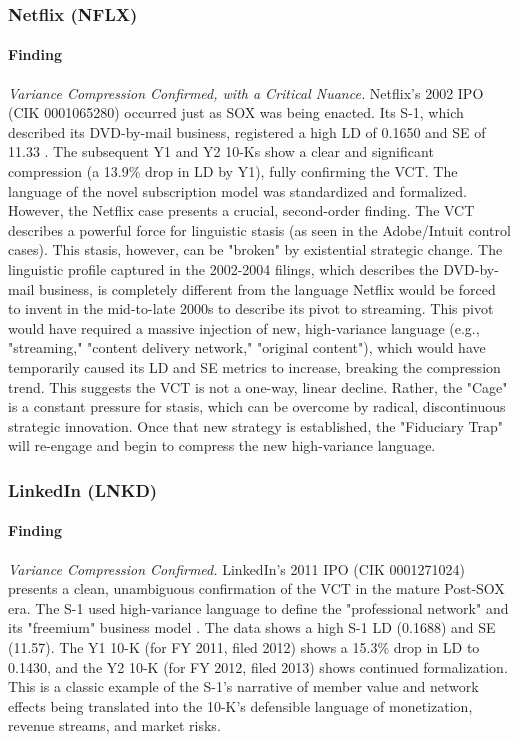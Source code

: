 \documentclass[12pt, letterpaper]{article}
\begin{document}
\subsubsection{Netflix (NFLX)}
\paragraph{Finding} \textit{Variance Compression Confirmed, with a Critical Nuance.}
Netflix's 2002 IPO (CIK 0001065280) occurred just as SOX was being enacted. Its S-1, which described its DVD-by-mail business, registered a high LD of 0.1650 and SE of 11.33 \cite{key10, key31}. The subsequent Y1 and Y2 10-Ks show a clear and significant compression (a 13.9\% drop in LD by Y1), fully confirming the VCT. The language of the novel subscription model was standardized and formalized. However, the Netflix case presents a crucial, second-order finding. The VCT describes a powerful force for linguistic stasis (as seen in the Adobe/Intuit control cases). This stasis, however, can be "broken" by existential strategic change. The linguistic profile captured in the 2002-2004 filings, which describes the DVD-by-mail business, is completely different from the language Netflix would be forced to invent in the mid-to-late 2000s to describe its pivot to streaming. This pivot would have required a massive injection of new, high-variance language (e.g., "streaming," "content delivery network," "original content"), which would have temporarily caused its LD and SE metrics to increase, breaking the compression trend. This suggests the VCT is not a one-way, linear decline. Rather, the "Cage" is a constant pressure for stasis, which can be overcome by radical, discontinuous strategic innovation. Once that new strategy is established, the "Fiduciary Trap" will re-engage and begin to compress the new high-variance language.

\subsubsection{LinkedIn (LNKD)}
\paragraph{Finding} \textit{Variance Compression Confirmed.}
LinkedIn's 2011 IPO (CIK 0001271024) presents a clean, unambiguous confirmation of the VCT in the mature Post-SOX era. The S-1 used high-variance language to define the "professional network" and its "freemium" business model \cite{key11, key32}. The data shows a high S-1 LD (0.1688) and SE (11.57). The Y1 10-K (for FY 2011, filed 2012) \cite{key33} shows a 15.3\% drop in LD to 0.1430, and the Y2 10-K (for FY 2012, filed 2013) \cite{key34} shows continued formalization. This is a classic example of the S-1's narrative of member value and network effects being translated into the 10-K's defensible language of monetization, revenue streams, and market risks.
\end{document}
